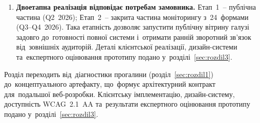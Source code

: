 \begin{enumerate}
    \item \textbf{Двоетапна реалізація відповідає потребам замовника.} Етап~1~-- публічна частина (Q2~2026); Етап~2~-- закрита частина моніторингу з~24~формами (Q3--Q4~2026). Така етапність дозволяє запустити публічну вітрину галузі задовго до~готовності повної системи і~отримати ранній зворотний зв'язок від~зовнішніх аудиторій. Деталі клієнтської реалізації, дизайн-системи та~експертного оцінювання прототипу подано у~розділі~\ref{sec:rozdil3}.
\end{enumerate}

Розділ переходить від~діагностики прогалини (розділ~\ref{sec:rozdil1}) до~концептуального артефакту, що~формує архітектурний контракт для~подальшої веб-розробки. Клієнтську імплементацію, дизайн-систему, доступність WCAG~2.1~AA та~результати експертного оцінювання прототипу подано у~розділі~\ref{sec:rozdil3}.
